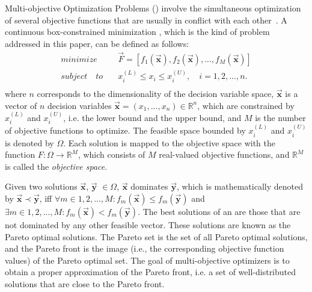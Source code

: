 Multi-objective Optimization Problems (\MOPS{}) 
involve the simultaneous optimization of several objective functions that are usually in conflict with each other~\citep{Joel:Kalyanmoy}. 
%
A continuous box-constrained minimization \MOP{}, which is the kind of problem addressed in this paper, can be defined as follows:
\begin{equation}
   \begin{split}
    minimize \quad & \vec{F} = [f_1(\vec{\mathbf{x}}), f_2(\vec{\mathbf{x}}), ..., f_M(\vec{\mathbf{x}})] \\
   subject \quad to \quad &  x_i^{(L)} \leq x_i \leq x_i^{(U)}, \quad i=1,2,..., n. \\
   \end{split}
\end{equation}
where $n$ corresponds to the dimensionality of the decision variable space, $\vec{\mathbf{x}}$ is a vector of $n$ 
decision variables $\vec{\mathbf{x}}=(x_1, ..., x_n) \in \mathbb{R}^n$, which are constrained by $x_i^{(L)}$ 
and $x_i^{(U)}$, i.e. the lower bound and the upper bound, and $M$ is the number of objective functions
to optimize.
%
The feasible space bounded by $x_i^{(L)}$ and $x_i^{(U)}$ is denoted by $\Omega$.
Each solution is mapped to the objective space with the function $F : \Omega \rightarrow \mathbb{R}^M$, 
which consists of $M$ real-valued objective functions, and $\mathbb{R}^M$ is called the \textit{objective space}. 

Given two solutions $\vec{\mathbf{x}}$, $\vec{\mathbf{y}}$ $\in \Omega$, $\vec{\mathbf{x}}$ dominates $\vec{\mathbf{y}}$, 
which is mathematically denoted by $\vec{\mathbf{x}} \prec \vec{\mathbf{y}}$, iff $\forall m \in {1,2,...,M} : 
f_m(\vec{\mathbf{x}}) \leq f_m(\vec{\mathbf{y}})$ and $\exists  m \in {1,2,...,M} : f_m(\vec{\mathbf{x}}) < f_m(\vec{\mathbf{y}})$.
%
The best solutions of an \MOP{} are those that are not dominated by any other feasible vector.
%
These solutions are known as the Pareto optimal solutions.
%
The Pareto set is the set of all Pareto optimal solutions, and the Pareto front is the image (i.e., the corresponding
objective function values) of the Pareto optimal set. 
%
The goal of multi-objective optimizers is to obtain a proper approximation of the Pareto front, i.e.
a set of well-distributed solutions that are close to the Pareto front.


